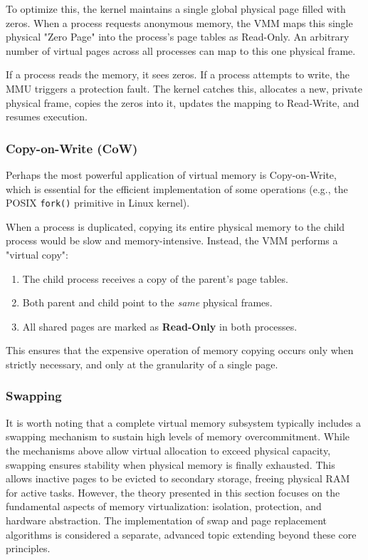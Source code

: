 \documentclass[a4paper,10pt,twoside]{report}
\theoremstyle{definition}
\begin{document}
To optimize this, the kernel maintains a single global physical page filled with zeros. When a process requests anonymous memory, the VMM maps this single physical "Zero Page" into the process's page tables as Read-Only. An arbitrary number of virtual pages across all processes can map to this one physical frame.

If a process reads the memory, it sees zeros. If a process attempts to write, the MMU triggers a protection fault. The kernel catches this, allocates a new, private physical frame, copies the zeros into it, updates the mapping to Read-Write, and resumes execution.

\subsubsection{Copy-on-Write (CoW)}

Perhaps the most powerful application of virtual memory is Copy-on-Write, which is essential for the efficient implementation of some operations (e.g., the POSIX \texttt{fork()} primitive in Linux kernel).

When a process is duplicated, copying its entire physical memory to the child process would be slow and memory-intensive. Instead, the VMM performs a "virtual copy":
\begin{enumerate}
    \item The child process receives a copy of the parent's page tables.
    \item Both parent and child point to the \textit{same} physical frames.
    \item All shared pages are marked as \textbf{Read-Only} in both processes.
\end{enumerate}

This ensures that the expensive operation of memory copying occurs only when strictly necessary, and only at the granularity of a single page.

\subsubsection{Swapping}

It is worth noting that a complete virtual memory subsystem typically includes a swapping mechanism to sustain high levels of memory overcommitment. While the mechanisms above allow virtual allocation to exceed physical capacity, swapping ensures stability when physical memory is finally exhausted. This allows inactive pages to be evicted to secondary storage, freeing physical RAM for active tasks. However, the theory presented in this section focuses on the fundamental aspects of memory virtualization: isolation, protection, and hardware abstraction. The implementation of swap and page replacement algorithms is considered a separate, advanced topic extending beyond these core principles.
\end{document}
